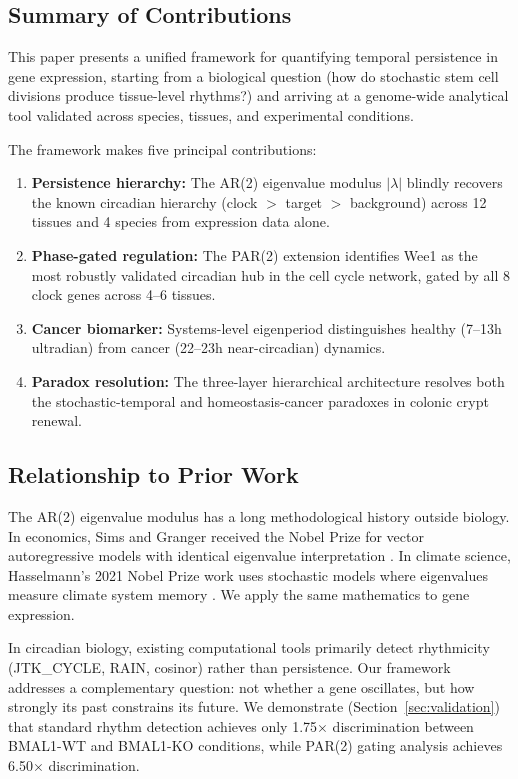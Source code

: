 \documentclass[11pt,letterpaper]{article}
\begin{document}
\subsection{Summary of Contributions}

This paper presents a unified framework for quantifying temporal persistence in gene expression, starting from a biological question (how do stochastic stem cell divisions produce tissue-level rhythms?) and arriving at a genome-wide analytical tool validated across species, tissues, and experimental conditions.

The framework makes five principal contributions:

\begin{enumerate}
\item \textbf{Persistence hierarchy:} The AR(2) eigenvalue modulus $|\lambda|$ blindly recovers the known circadian hierarchy (clock $>$ target $>$ background) across 12 tissues and 4 species from expression data alone.
\item \textbf{Phase-gated regulation:} The PAR(2) extension identifies Wee1 as the most robustly validated circadian hub in the cell cycle network, gated by all 8 clock genes across 4--6 tissues.
\item \textbf{Cancer biomarker:} Systems-level eigenperiod distinguishes healthy (7--13h ultradian) from cancer (22--23h near-circadian) dynamics.
\item \textbf{Paradox resolution:} The three-layer hierarchical architecture resolves both the stochastic-temporal and homeostasis-cancer paradoxes in colonic crypt renewal.
\end{enumerate}

\subsection{Relationship to Prior Work}

The AR(2) eigenvalue modulus has a long methodological history outside biology. In economics, Sims and Granger received the Nobel Prize for vector autoregressive models with identical eigenvalue interpretation \citep{sims1980macroeconomics}. In climate science, Hasselmann's 2021 Nobel Prize work uses stochastic models where eigenvalues measure climate system memory \citep{hasselmann1976stochastic}. We apply the same mathematics to gene expression.

In circadian biology, existing computational tools primarily detect rhythmicity (JTK\_CYCLE, RAIN, cosinor) rather than persistence. Our framework addresses a complementary question: not whether a gene oscillates, but how strongly its past constrains its future. We demonstrate (Section~\ref{sec:validation}) that standard rhythm detection achieves only 1.75$\times$ discrimination between BMAL1-WT and BMAL1-KO conditions, while PAR(2) gating analysis achieves 6.50$\times$ discrimination.
\end{document}
